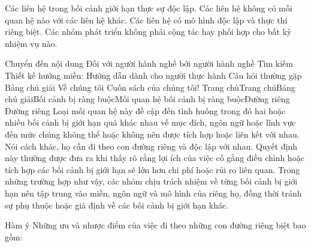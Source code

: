 
Các liên hệ trong bối cảnh giới hạn thực sự độc lập.
Các liên hệ không có mối quan hệ nào với các liên hệ khác.
Các liên hệ có mô hình độc lập và thực thi riêng biệt.
Các nhóm phát triển không phải cộng tác hay phối hợp cho bất kỳ nhiệm vụ nào.




Chuyển đến nội dung
Đối với người hành nghề bởi người hành nghề
Tìm kiếm
Thiết kế hướng miền: Hướng dẫn dành cho người thực hành
Câu hỏi thường gặp
Bảng chú giải
Về chúng tôi
Cuốn sách của chúng tôi!
Trang chủTrang chủBảng chú giảiBối cảnh bị ràng buộcMối quan hệ bối cảnh bị ràng buộcĐường riêng
Đường riêng
Loại mối quan hệ này đề cập đến tình huống trong đó hai hoặc nhiều bối cảnh bị giới hạn quá khác nhau về mục đích, ngôn ngữ hoặc lĩnh vực đến mức chúng không thể hoặc không nên được tích hợp hoặc liên kết với nhau. Nói cách khác, họ cần đi theo con đường riêng và độc lập với nhau. Quyết định này thường được đưa ra khi thấy rõ rằng lợi ích của việc cố gắng điều chỉnh hoặc tích hợp các bối cảnh bị giới hạn sẽ lớn hơn chi phí hoặc rủi ro liên quan. Trong những trường hợp như vậy, các nhóm chịu trách nhiệm về từng bối cảnh bị giới hạn nên tập trung vào miền, ngôn ngữ và mô hình của riêng họ, đồng thời tránh sự phụ thuộc hoặc giả định về các bối cảnh bị giới hạn khác.

Hàm ý
Những ưu và nhược điểm của việc đi theo những con đường riêng biệt bao gồm:

